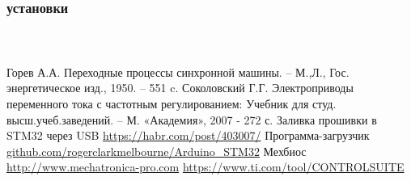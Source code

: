 \documentclass[14pt]{beamer}
\begin{document}
\begin{frame}
\frametitle{ установки}
\begin{figure}
\begin{center}
  \\
\end{center}
\end{figure}

\end{frame}

\begin{frame}
\frametitle{}
	\small{
\begin{thebibliography}{7}
	Горев А.А. Переходные процессы синхронной машины. -- М.,Л., Гос. энергетическое изд., 1950. -- 551 c.
        Соколовский Г.Г. Электроприводы переменного тока с частотным регулированием: Учебник для студ. высш.учеб.заведений.
                -- М. «Академия», 2007 - 272 с.
	Заливка прошивки в STM32 через USB \url{https://habr.com/post/403007/}
	Программа-загрузчик \url{github.com/rogerclarkmelbourne/Arduino\_STM32}
	Мехбиос \url{http://www.mechatronica-pro.com}
	 \url{https://www.ti.com/tool/CONTROLSUITE}
%

\end{thebibliography}
}
\end{frame}
\end{document}
